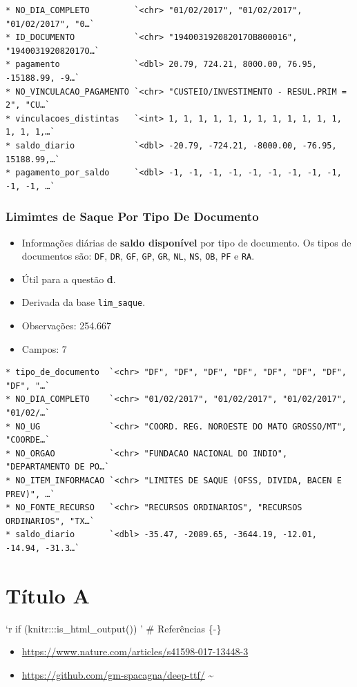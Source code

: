 \documentclass[]{book}
\providecommand{\tightlist}{%
  \setlength{\itemsep}{0pt}\setlength{\parskip}{0pt}}
\begin{document}
\begin{verbatim}
* NO_DIA_COMPLETO         `<chr> "01/02/2017", "01/02/2017", "01/02/2017", "0…`
* ID_DOCUMENTO            `<chr> "194003192082017OB800016", "194003192082017O…`
* pagamento               `<dbl> 20.79, 724.21, 8000.00, 76.95, -15188.99, -9…`
* NO_VINCULACAO_PAGAMENTO `<chr> "CUSTEIO/INVESTIMENTO - RESUL.PRIM = 2", "CU…`
* vinculacoes_distintas   `<int> 1, 1, 1, 1, 1, 1, 1, 1, 1, 1, 1, 1, 1, 1, 1,…`
* saldo_diario            `<dbl> -20.79, -724.21, -8000.00, -76.95, 15188.99,…`
* pagamento_por_saldo     `<dbl> -1, -1, -1, -1, -1, -1, -1, -1, -1, -1, -1, …`
\end{verbatim}

\hypertarget{limimtes-de-saque-por-tipo-de-documento}{%
\subsection{Limimtes de Saque Por Tipo De Documento}\label{limimtes-de-saque-por-tipo-de-documento}}

\begin{itemize}
\item
  Informações diárias de \textbf{saldo disponível} por tipo de documento. Os tipos de documentos são: \texttt{DF}, \texttt{DR}, \texttt{GF}, \texttt{GP}, \texttt{GR}, \texttt{NL}, \texttt{NS}, \texttt{OB}, \texttt{PF} e \texttt{RA}.
\item
  Útil para a questão \textbf{d}.
\item
  Derivada da base \texttt{lim\_saque}.
\item
  Observações: 254.667
\item
  Campos: 7
\end{itemize}

\begin{verbatim}
* tipo_de_documento  `<chr> "DF", "DF", "DF", "DF", "DF", "DF", "DF", "DF", "…`
* NO_DIA_COMPLETO    `<chr> "01/02/2017", "01/02/2017", "01/02/2017", "01/02/…`
* NO_UG              `<chr> "COORD. REG. NOROESTE DO MATO GROSSO/MT", "COORDE…`
* NO_ORGAO           `<chr> "FUNDACAO NACIONAL DO INDIO", "DEPARTAMENTO DE PO…`
* NO_ITEM_INFORMACAO `<chr> "LIMITES DE SAQUE (OFSS, DIVIDA, BACEN E PREV)", …`
* NO_FONTE_RECURSO   `<chr> "RECURSOS ORDINARIOS", "RECURSOS ORDINARIOS", "TX…`
* saldo_diario       `<dbl> -35.47, -2089.65, -3644.19, -12.01, -14.94, -31.3…`
\end{verbatim}

\hypertarget{tuxedtulo-a}{%
\chapter{Título A}\label{tuxedtulo-a}}

`r if (knitr:::is\_html\_output()) '
\# Referências \{-\}

\begin{itemize}
\tightlist
\item
  \url{https://www.nature.com/articles/s41598-017-13448-3}
\item
  \url{https://github.com/gm-spacagna/deep-ttf/}
  \textasciitilde{}
\end{itemize}


\end{document}
